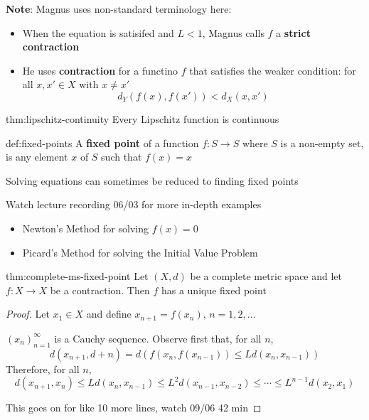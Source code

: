 \documentclass[landscape, 8pt]{extarticle}
\begin{document}
\begin{multicols}{3}
\textbf{Note}: Magnus uses non-standard terminology here:
\begin{itemize}
    \item When the equation is satisifed and $L < 1$, Magnus calls $f$ a \textbf{strict contraction}
    \item He uses \textbf{contraction} for a functino $f$ that satisfies the weaker condition: for all $x, x' \in X$ with $x \ne x'$
        \[d_{Y}(f(x), f(x')) < d_{X}(x,x')\]
\end{itemize}

\begin{thm}{thm:lipschitz-continuity}{}
    Every Lipschitz function is continuous
\end{thm}

\begin{dfn}{def:fixed-points}{}
    A \textbf{fixed point} of a function $f: S \to S $ where $S$ is a non-empty set, is any element $x$ of $S$ such that $f(x) = x$

    Solving equations can sometimes be reduced to finding fixed points
\end{dfn}

Watch lecture recording 06/03 for more in-depth examples
\begin{itemize}
    \item Newton's Method for solving $f(x) = 0$
    \item Picard's Method for solving the Initial Value Problem
\end{itemize}

\begin{thm}{thm:complete-ms-fixed-point}{}
    Let $(X, d)$ be a complete metric space and let $f : X \to X$ be a contraction. Then $f$ has a unique fixed point
\end{thm}

\begin{proof}
    Let $x_{1}\in X$ and define $x_{n+1} = f(x_{n}),\, n = 1,2,\dots$

    $(x_{n})^{\infty}_{n = 1}$ is a Cauchy sequence. Observe first that, for all $n$,
    \[d(x_{n+1}, d+n) = d(f(x_{n}, f(x_{n-1})) \le L d(x_{n}, x_{n-1}))\]
    Therefore, for all $n$,
    \[d(x_{n+1}, x_{n}) \le Ld(x_{n}, x_{n-1})\le L^{2}d(x_{n-1},x_{n-2}) \le \cdots \le L^{n-1}d(x_{2}, x_{1})\]

    This goes on for like 10 more lines, watch 09/06 42 min
\end{proof}


\end{multicols}
\end{document}
